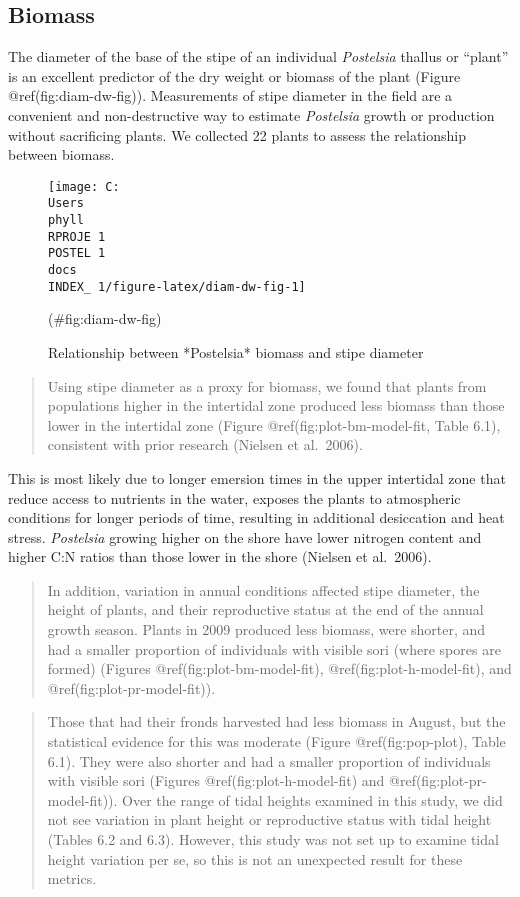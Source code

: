 \documentclass[
]{article}
\begin{document}
\hypertarget{biomass}{%
\subsection{Biomass}\label{biomass}}

The diameter of the base of the stipe of an individual \emph{Postelsia} thallus or ``plant'' is an excellent predictor of the dry weight or biomass of the plant (Figure @ref(fig:diam-dw-fig)). Measurements of stipe diameter in the field are a convenient and non-destructive way to estimate \emph{Postelsia} growth or production without sacrificing plants. We collected 22 plants to assess the relationship between biomass.

\begin{figure}

\texttt{[image: C:\\Users\\phyll\\RPROJE~1\\POSTEL~1\\docs\\INDEX\_~1/figure-latex/diam-dw-fig-1]} \hfill{}

\caption{ Relationship between *Postelsia* biomass and stipe diameter}(\#fig:diam-dw-fig)
\end{figure}

\begin{quote}
Using stipe diameter as a proxy for biomass, we found that plants from populations higher in the intertidal zone produced less biomass than those lower in the intertidal zone (Figure @ref(fig:plot-bm-model-fit, Table 6.1), consistent with prior research (Nielsen et al.~2006).
\end{quote}

This is most likely due to longer emersion times in the upper intertidal zone that reduce access to nutrients in the water, exposes the plants to atmospheric conditions for longer periods of time, resulting in additional desiccation and heat stress. \emph{Postelsia} growing higher on the shore have lower nitrogen content and higher C:N ratios than those lower in the shore (Nielsen et al.~2006).

\begin{quote}
In addition, variation in annual conditions affected stipe diameter, the height of plants, and their reproductive status at the end of the annual growth season. Plants in 2009 produced less biomass, were shorter, and had a smaller proportion of individuals with visible sori (where spores are formed) (Figures @ref(fig:plot-bm-model-fit), @ref(fig:plot-h-model-fit), and @ref(fig:plot-pr-model-fit)).
\end{quote}

\begin{quote}
Those that had their fronds harvested had less biomass in August, but the statistical evidence for this was moderate (Figure @ref(fig:pop-plot), Table 6.1). They were also shorter and had a smaller proportion of individuals with visible sori (Figures @ref(fig:plot-h-model-fit) and @ref(fig:plot-pr-model-fit)). Over the range of tidal heights examined in this study, we did not see variation in plant height or reproductive status with tidal height (Tables 6.2 and 6.3). However, this study was not set up to examine tidal height variation per se, so this is not an unexpected result for these metrics.
\end{quote}
\end{document}
